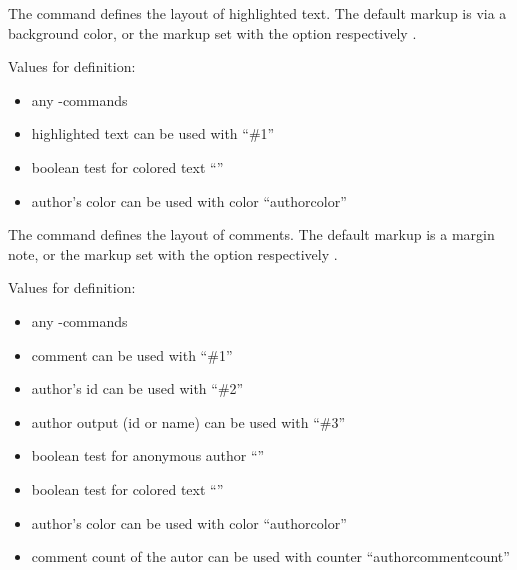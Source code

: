 

The command  defines the layout of highlighted text.
The default markup is via a background color, or the markup set with the option  respectively .

Values for definition:

\begin{itemize}
	\item any -commands
	\item highlighted text can be used with ``\#1''
	\item {} boolean test for colored text ``''
	\item author's color can be used with color ``authorcolor''
\end{itemize}





The command  defines the layout of comments.
The default markup is a margin note, or the markup set with the option  respectively .

Values for definition:

\begin{itemize}
	\item any -commands
	\item comment can be used with ``\#1''
	\item author's id can be used with ``\#2''
	\item author output (id or name) can be used with ``\#3''
	\item {} boolean test for anonymous author ``''
	\item {} boolean test for colored text ``''
	\item author's color can be used with color ``authorcolor''
	\item comment count of the autor can be used with counter ``authorcommentcount''
\end{itemize}




